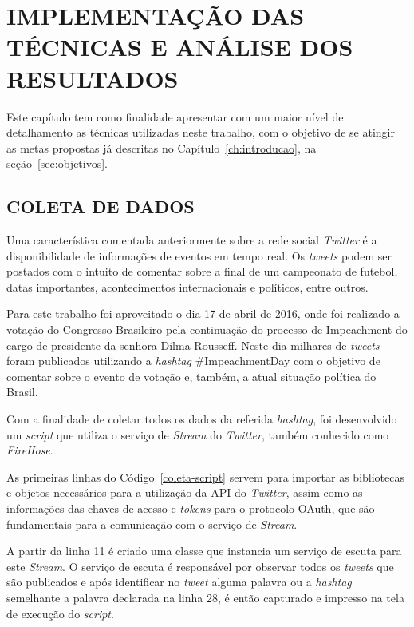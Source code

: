 \chapter{IMPLEMENTAÇÃO DAS TÉCNICAS E ANÁLISE DOS RESULTADOS}\label{ch:implementacao}

Este capítulo tem como finalidade apresentar com um maior nível de detalhamento as técnicas utilizadas neste trabalho, com o objetivo de se atingir as metas propostas já descritas no Capítulo~\ref{ch:introducao}, na seção~\ref{sec:objetivos}.

\section{COLETA DE DADOS}
Uma característica comentada anteriormente sobre a rede social \textit{Twitter} é a disponibilidade de informações de eventos em tempo real. Os \textit{tweets} podem ser postados com o intuito de comentar sobre a final de um campeonato de futebol, datas importantes, acontecimentos internacionais e políticos, entre outros.

Para este trabalho foi aproveitado o dia 17 de abril de 2016, onde foi realizado a votação do Congresso Brasileiro pela continuação do processo de Impeachment do cargo de presidente da senhora Dilma Rousseff. Neste dia milhares de \textit{tweets} foram publicados utilizando a \textit{hashtag} \#ImpeachmentDay com o objetivo de comentar sobre o evento de votação e, também, a atual situação política do Brasil.

Com a finalidade de coletar todos os dados da referida \textit{hashtag}, foi desenvolvido um \textit{script} que utiliza o serviço de \textit{Stream} do \textit{Twitter}, também conhecido como \textit{FireHose}.

As primeiras linhas do Código~\ref{coleta-script} servem para importar as bibliotecas e objetos necessários para a utilização da API do \textit{Twitter}, assim como as informações das chaves de acesso e \textit{tokens} para o protocolo OAuth, que são fundamentais para a comunicação com o serviço de \textit{Stream}.



A partir da linha 11 é criado uma classe que instancia um serviço de escuta para este \textit{Stream}. O serviço de escuta é responsável por observar todos os \textit{tweets} que são publicados e após identificar no \textit{tweet} alguma palavra ou a \textit{hashtag} semelhante a palavra declarada na linha 28, é então capturado e impresso na tela de execução do \textit{script}.


